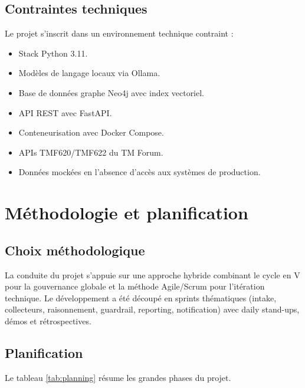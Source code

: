 \subsection{Contraintes techniques}
Le projet s'inscrit dans un environnement technique contraint :

\begin{itemize}
    \setlength\itemsep{0.1em}
    \setlength\parskip{0pt}
    \setlength\parsep{0pt}
    \item Stack Python 3.11.
    \item Modèles de langage locaux via Ollama.
    \item Base de données graphe Neo4j avec index vectoriel.
    \item API REST avec FastAPI.
    \item Conteneurisation avec Docker Compose.
    \item APIs TMF620/TMF622 du TM Forum.
    \item Données mockées en l'absence d'accès aux systèmes de production.
\end{itemize}

\section{Méthodologie et planification}

\subsection{Choix méthodologique}
La conduite du projet s'appuie sur une approche hybride combinant le cycle en V pour la gouvernance globale et la méthode Agile/Scrum pour l'itération technique. Le développement a été découpé en sprints thématiques (intake, collecteurs, raisonnement, guardrail, reporting, notification) avec daily stand-ups, démos et rétrospectives.

\subsection{Planification}
Le tableau \ref{tab:planning} résume les grandes phases du projet.


